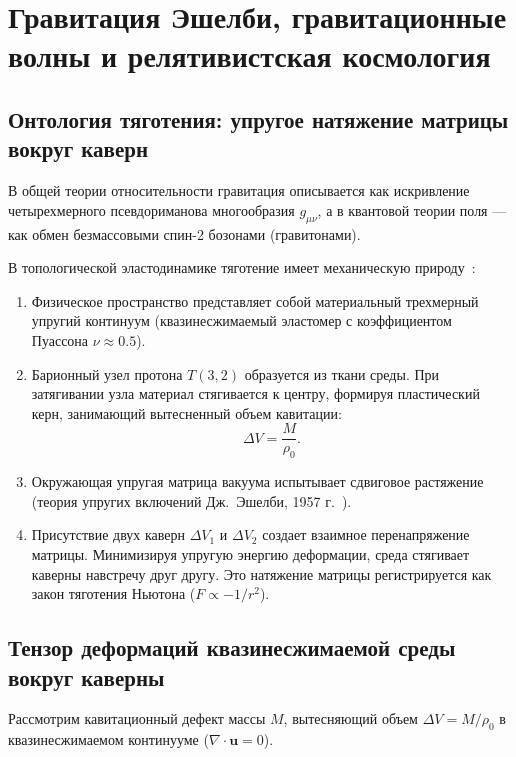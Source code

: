 \documentclass[11pt,a4paper]{article}
\theoremstyle{definition}
\theoremstyle{remark}
\begin{document}
\section{Гравитация Эшелби, гравитационные волны и релятивистская космология}

\subsection{Онтология тяготения: упругое натяжение матрицы вокруг каверн}

В общей теории относительности гравитация описывается как искривление четырехмерного псевдориманова многообразия $g_{\mu\nu}$, а в квантовой теории поля — как обмен безмассовыми спин-2 бозонами (гравитонами).

В топологической эластодинамике тяготение имеет механическую природу~\cite{Volovik2003}:
\begin{enumerate}
\item Физическое пространство представляет собой материальный трехмерный упругий континуум (квазинесжимаемый эластомер с коэффициентом Пуассона $\nu \approx 0.5$).
\item Барионный узел протона $T(3,2)$ образуется из ткани среды. При затягивании узла материал стягивается к центру, формируя пластический керн, занимающий вытесненный объем кавитации:
\begin{equation}
\Delta V = \frac{M}{\rho_0}.
\label{eq:cavitation_volume_def}
\end{equation}
\item Окружающая упругая матрица вакуума испытывает сдвиговое растяжение (теория упругих включений Дж.~Эшелби, 1957 г.~\cite{Eshelby1957}).
\item Присутствие двух каверн $\Delta V_1$ и $\Delta V_2$ создает взаимное перенапряжение матрицы. Минимизируя упругую энергию деформации, среда стягивает каверны навстречу друг другу. Это натяжение матрицы регистрируется как закон тяготения Ньютона ($F \propto -1/r^2$).
\end{enumerate}

\subsection{Тензор деформаций квазинесжимаемой среды вокруг каверны}

Рассмотрим кавитационный дефект массы $M$, вытесняющий объем $\Delta V = M / \rho_0$ в квазинесжимаемом континууме ($\nabla \cdot \mathbf{u} = 0$).
\end{document}
